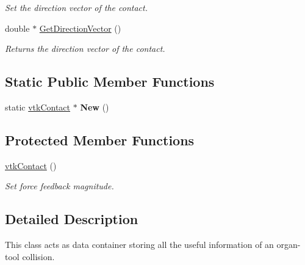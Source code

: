 \begin{DoxyCompactItemize}
\begin{DoxyCompactList}\small\item\em Set the direction vector of the contact. \item\end{DoxyCompactList}\item 
\hypertarget{classvtkContact_ab9da97d6f2fdaa969bbb923c917419d2}{
double $\ast$ \hyperlink{classvtkContact_ab9da97d6f2fdaa969bbb923c917419d2}{GetDirectionVector} ()}
\label{classvtkContact_ab9da97d6f2fdaa969bbb923c917419d2}

\begin{DoxyCompactList}\small\item\em Returns the direction vector of the contact. \item\end{DoxyCompactList}\end{DoxyCompactItemize}
\subsection*{Static Public Member Functions}
\begin{DoxyCompactItemize}
\item 
\hypertarget{classvtkContact_aa745684ad927626b1b16126fb339a799}{
static \hyperlink{classvtkContact}{vtkContact} $\ast$ {\bfseries New} ()}
\label{classvtkContact_aa745684ad927626b1b16126fb339a799}

\end{DoxyCompactItemize}
\subsection*{Protected Member Functions}
\begin{DoxyCompactItemize}
\item 
\hyperlink{classvtkContact_a1cceca85a524ff06fd3a985e680a91f1}{vtkContact} ()
\begin{DoxyCompactList}\small\item\em Set force feedback magnitude. \item\end{DoxyCompactList}\end{DoxyCompactItemize}


\subsection{Detailed Description}
This class acts as data container storing all the useful information of an organ-\/tool collision. 

